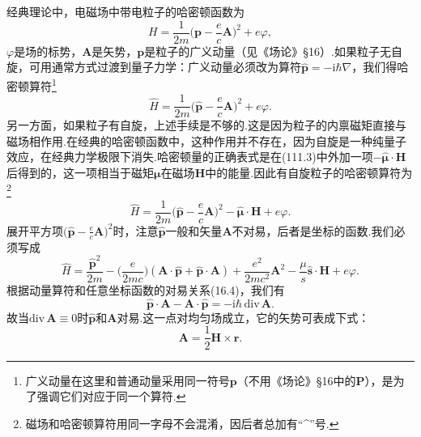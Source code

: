 经典理论中，电磁场中带电粒子的哈密顿函数为
\begin{equation*}
  H=\frac{1}{2m}\biggl(\boldsymbol{p}-\frac{e}{c}\boldsymbol{A}\biggr)^2+e\varphi,
\end{equation*}
$\varphi$是场的标势，$\boldsymbol{A}$是矢势，$\boldsymbol{p}$是粒子的广义动量（见《场论》§16）.如果粒子无自旋，可用通常方式过渡到量子力学：广义动量必须改为算符$\hat{\boldsymbol{p}}=-\mathrm{i}\hbar\nabla$，我们得哈密顿算符\footnote{广义动量在这里和普通动量采用同一符号$\boldsymbol{p}$（不用《场论》§16中的$\boldsymbol{P}$），是为了强调它们对应于同一个算符.}
\begin{equation}
  \hat{H}=\frac{1}{2m}\biggl(\hat{\boldsymbol{p}}-\frac{e}{c}\boldsymbol{A}\biggr)^2+e\varphi.
\end{equation}
另一方面，如果粒子有自旋，上述手续是不够的.这是因为粒子的内禀磁矩直接与磁场相作用.在经典的哈密顿函数中，这种作用并不存在，因为自旋是一种纯量子效应，在经典力学极限下消失.哈密顿量的正确表式是在(111.3)中外加一项$-\hat{\boldsymbol{\mu}}\cdot\boldsymbol{H}$后得到的，这一项相当于磁矩$\boldsymbol{\mu}$在磁场$\boldsymbol{H}$中的能量.因此有自旋粒子的哈密顿算符为\footnote{磁场和哈密顿算符用同一字母不会混淆，因后者总加有“\textasciicircum{}”号.}
\begin{equation}
  \hat{H}=\frac{1}{2m}\biggl(\hat{\boldsymbol{p}}-\frac{e}{c}\boldsymbol{A}\biggr)^2-\hat{\boldsymbol{\mu}}\cdot\boldsymbol{H}+e\varphi.
\end{equation}
展开平方项$\biggl(\hat{\boldsymbol{p}}-\frac{e}{c}\boldsymbol{A}\biggr)^2$时，注意$\hat{\boldsymbol{p}}$一般和矢量$\boldsymbol{A}$不对易，后者是坐标的函数.我们必须写成
\begin{equation}
  \hat{H}=\frac{\hat{\boldsymbol{p}}^2}{2m}-\biggl(\frac{e}{2mc}\biggr)(\boldsymbol{A}\cdot\hat{\boldsymbol{p}}+\hat{\boldsymbol{p}}\cdot\boldsymbol{A})+\frac{e^2}{2mc^2}\boldsymbol{A}^2-\frac{\mu}{s}\hat{\boldsymbol{s}}\cdot\boldsymbol{H}+e\varphi.
\end{equation}
根据动量算符和任意坐标函数的对易关系(16.4)，我们有
\begin{equation}
  \hat{\boldsymbol{p}}\cdot\boldsymbol{A}-\boldsymbol{A}\cdot\hat{\boldsymbol{p}}=-\mathrm{i}\hbar\,\mathrm{div}\,\boldsymbol{A}.
\end{equation}
故当$\mathrm{div}\,\boldsymbol{A}\equiv0$时$\hat{\boldsymbol{p}}$和$\boldsymbol{A}$对易.这一点对均匀场成立，它的矢势可表成下式：
\begin{equation}
  \boldsymbol{A}=\frac{1}{2}\boldsymbol{H}\times\boldsymbol{r}.
\end{equation}

